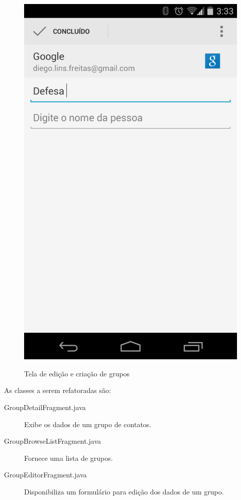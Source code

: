 \begin{figure}[!ht]
\begin{minipage}[b]{0.45\linewidth}
		\caption{Tela de edição e criação de grupos}
		\begin{center} 
			\includegraphics[scale=0.18]{img/contacts_edit.png}
		\end{center}
		\label{fig:groups_edit}
	\end{minipage}
\end{figure}


As classes a serem refatoradas são:
\begin{description}
\item[GroupDetailFragment.java] Exibe os dados de um grupo de contatos.
\item[GroupBrowseListFragment.java] Fornece uma lista de grupos.
\item[GroupEditorFragment.java] Disponibiliza um formulário para edição dos
dados de um grupo.
\end{description}

